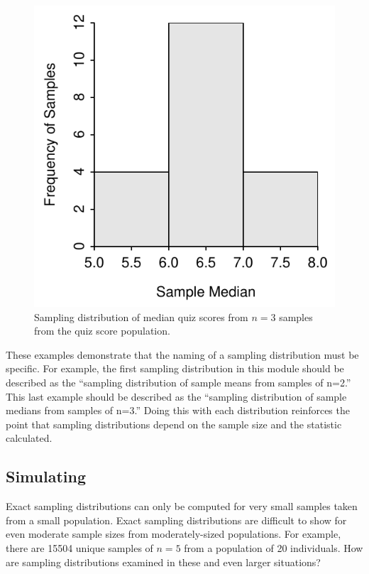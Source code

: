 \documentclass[10pt,openany]{book}\usepackage[]{graphicx}\usepackage[]{color}
\newenvironment{knitrout}{}{} %
\begin{document}
\begin{knitrout}
\color{fgcolor}\begin{figure}[hbtp]

{\centering \includegraphics[width=.37\linewidth]{Figs/SDistQuizMdns3-1} 

}

\caption[Sampling distribution of median quiz scores from $n=3$ samples from the quiz score population]{Sampling distribution of median quiz scores from $n=3$ samples from the quiz score population.}\label{fig:SDistQuizMdns3}
\end{figure}


\end{knitrout}

These examples demonstrate that the naming of a sampling distribution must be specific. For example, the first sampling distribution in this module should be described as the ``sampling distribution of sample means from samples of n=2.''  This last example should be described as the ``sampling distribution of sample medians from samples of n=3.''  Doing this with each distribution reinforces the point that sampling distributions depend on the sample size and the statistic calculated.

\vspace{-3pt}


\subsection{Simulating} \label{sect:SDSimulate}
Exact sampling distributions can only be computed for very small samples taken from a small population. Exact sampling distributions are difficult to show for even moderate sample sizes from moderately-sized populations. For example, there are 15504 unique samples of $n=5$ from a population of 20 individuals. How are sampling distributions examined in these and even larger situations?
\end{document}
